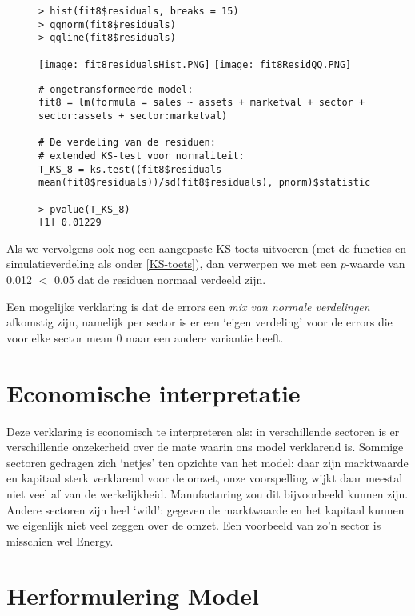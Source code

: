 \documentclass[a4paper]{report}
\begin{document}
  \begin{figure}[H]
  \begin{verbatim}
> hist(fit8$residuals, breaks = 15)
> qqnorm(fit8$residuals)
> qqline(fit8$residuals)
  \end{verbatim}
  \begin{center}
    \texttt{[image: fit8residualsHist.PNG]}
    \texttt{[image: fit8ResidQQ.PNG]}
  \end{center}
  \begin{verbatim}
# ongetransformeerde model:
fit8 = lm(formula = sales ~ assets + marketval + sector + sector:assets + sector:marketval)

# De verdeling van de residuen:
# extended KS-test voor normaliteit:
T_KS_8 = ks.test((fit8$residuals - mean(fit8$residuals))/sd(fit8$residuals), pnorm)$statistic

> pvalue(T_KS_8)
[1] 0.01229
  \end{verbatim}
  \end{figure}
  
  Als we vervolgens ook nog een aangepaste KS-toets uitvoeren (met de functies en simulatieverdeling als onder \ref{KS-toets}), dan verwerpen we met een $p$-waarde van 0.012 $<$ 0.05 dat de residuen normaal verdeeld zijn.
  
  Een mogelijke verklaring is dat de errors een \emph{mix van normale verdelingen} afkomstig zijn, namelijk per sector is er een `eigen verdeling' voor de errors die voor elke sector mean 0 maar een andere variantie heeft.
  
\section{Economische interpretatie}
  Deze verklaring is economisch te interpreteren als: in verschillende sectoren is er verschillende onzekerheid over de mate waarin ons model verklarend is. Sommige sectoren gedragen zich `netjes' ten opzichte van het model: daar zijn marktwaarde en kapitaal sterk verklarend voor de omzet, onze voorspelling wijkt daar meestal niet veel af van de werkelijkheid. Manufacturing zou dit bijvoorbeeld kunnen zijn. Andere sectoren zijn heel `wild': gegeven de marktwaarde en het kapitaal kunnen we eigenlijk niet veel zeggen over de omzet. Een voorbeeld van zo'n sector is misschien wel Energy.
  
\section{Herformulering Model}
\label{herformulering}
  
\end{document}
